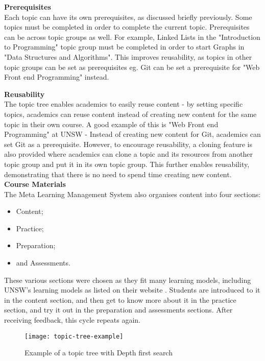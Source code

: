\textbf{Prerequisites} \\

Each topic can have its own prerequisites, as discussed briefly previously. Some topics must be completed in order to complete the current topic. Prerequisites can be across topic groups as well. For example, Linked Lists in the "Introduction to Programming" topic group must be completed in order to start Graphs in "Data Structures and Algorithms". This improves reusability, as topics in other topic groups can be set as prerequisites eg. Git can be set a prerequisite for "Web Front end Programming" instead.

\textbf{Reusability} \\
The topic tree enables academics to easily reuse content - by setting specific topics, academics can reuse content instead of creating new content for the same topic in their own course. A good example of this is "Web Front end Programming" at UNSW - Instead of creating new content for Git, academics can set Git as a prerequisite. However, to encourage reusability, a cloning feature is also provided where academics can clone a topic and its resources from another topic group and put it in its own topic group. This further enables reusability, demonstrating that there is no need to spend time creating new content.\\

\textbf{Course Materials} \\
The Meta Learning Management System also organises content into four sections:
\begin{itemize}
    \item Content;
    \item Practice;
    \item Preparation;
    \item and Assessments.
\end{itemize}

These various sections were chosen as they fit many learning models, including UNSW's learning models as listed on their website \cite{learningModel}. Students are introduced to it in the content section, and then get to know more about it in the practice section, and try it out in the preparation and assessments sections. After receiving feedback, this cycle repeats again.\\

\begin{figure}[h!]
    \centering
    \texttt{[image: topic-tree-example]}
    \caption{Example of a topic tree with Depth first search}
\end{figure}

